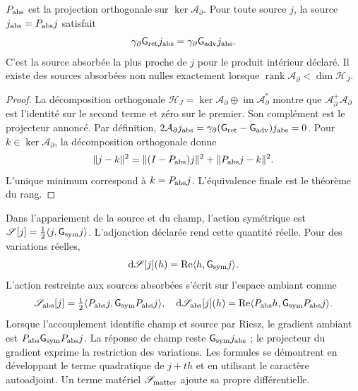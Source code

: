 \begin{theorem}
\label{vii:thm:proyeccion-absorcion}
\(P_{\rm abs}\) est la projection orthogonale sur \(\ker\mathcal A_\partial\). Pour toute source \(j\), la source \(j_{\rm abs}=P_{\rm abs}j\) satisfait
\begin{equation}
 \gamma_\partial \mathsf{G}_{\rm ret}j_{\rm abs}
 =\gamma_\partial \mathsf{G}_{\rm adv}j_{\rm abs}.
 \label{vii:eq:igualdad-borde-absorbido}
\end{equation}
C'est la source absorbée la plus proche de \(j\) pour le produit intérieur
déclaré. Il existe des sources absorbées non nulles exactement lorsque
\(\operatorname{rank}\mathcal A_\partial<\dim\mathcal H_J\).
\end{theorem}
\begin{proof}
La décomposition orthogonale
\(\mathcal H_J=\ker\mathcal A_\partial\oplus
 \operatorname{im}\mathcal A_\partial^*\) montre que
\(\mathcal A_\partial^+\mathcal A_\partial\) est l'identité
sur le second terme et zéro sur le premier. Son complément est le
projecteur annoncé. Par définition,
\(2\mathcal A_\partial j_{\rm abs}
 =\gamma_\partial(\mathsf{G}_{\rm ret}-\mathsf{G}_{\rm adv})j_{\rm abs}=0\).
Pour \(k\in\ker\mathcal A_\partial\), la décomposition orthogonale donne
\[
 \|j-k\|^2=\|(I-P_{\rm abs})j\|^2+\|P_{\rm abs}j-k\|^2.
\]
L'unique minimum correspond à \(k=P_{\rm abs}j\). L'équivalence finale est le théorème du rang.
\end{proof}

Dans l'appariement de la source et du champ, l'action symétrique est
\(\mathscr S[j]=\tfrac12\langle j,\mathsf{G}_{\rm sym}j\rangle\).
L'adjonction déclarée rend cette quantité réelle. Pour des variations réelles,
\[
 \mathrm d\mathscr S[j](h)
 =\operatorname{Re}\langle h,\mathsf{G}_{\rm sym}j\rangle.
\]
L'action restreinte aux sources absorbées s'écrit sur l'espace ambiant comme
\begin{equation}
 \mathscr S_{\rm abs}[j]
 =\tfrac12\langle P_{\rm abs}j,\mathsf{G}_{\rm sym}P_{\rm abs}j\rangle,
 \quad
 \mathrm d\mathscr S_{\rm abs}[j](h)
 =\operatorname{Re}\langle P_{\rm abs}h,\mathsf{G}_{\rm sym}P_{\rm abs}j\rangle.
 \label{vii:eq:variacion-restringida-absorcion}
\end{equation}
Lorsque l'accouplement identifie champ et source par Riesz, le gradient ambiant est \(P_{\rm abs}\mathsf{G}_{\rm sym}P_{\rm abs}j\). La réponse de champ reste \(\mathsf{G}_{\rm sym}j_{\rm abs}\) ; le projecteur du gradient exprime la restriction des variations. Les formules se démontrent en développant le terme quadratique de \(j+th\) et en utilisant le caractère autoadjoint. Un terme matériel \(\mathscr S_{\rm matter}\) ajoute sa propre différentielle.

